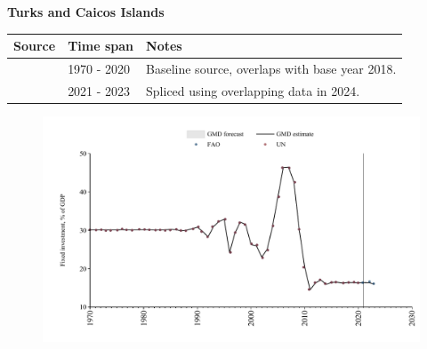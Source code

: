 \documentclass[12pt,a4paper,landscape]{article}
\begin{document}
\begin{adjustbox}{max totalsize={\paperwidth}{\paperheight},center}
\begin{minipage}[t][\textheight][t]{\textwidth}
\vspace*{0.5cm}
{}
\begin{center}
{\Large\bfseries Turks and Caicos Islands}
\end{center}
\vspace{0.5cm}
\begin{table}[H]
\centering
\small
\begin{tabular}{|l|l|l|}
\hline
\textbf{Source} & \textbf{Time span} & \textbf{Notes} \\
\hline
\rowcolor{white}\cite{UN}& 1970 - 2020 &Baseline source, overlaps with base year 2018.\\
\rowcolor{lightgray}\cite{FAO}& 2021 - 2023 &Spliced using overlapping data in 2024.\\
\hline
\end{tabular}
\end{table}
\begin{figure}[H]
\centering
\includegraphics[width=\textwidth,height=0.6\textheight,keepaspectratio]{graphs/TCA_finv_GDP.pdf}
\end{figure}
\end{minipage}
\end{adjustbox}
\end{document}
